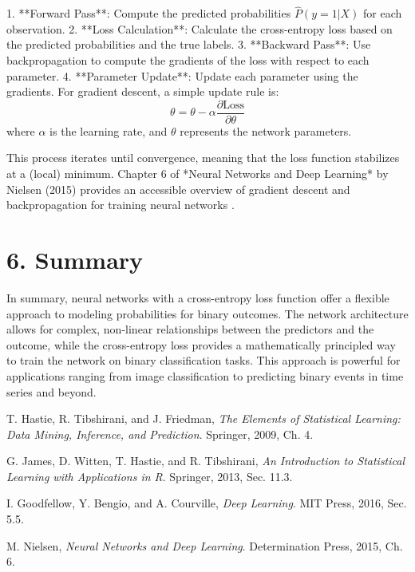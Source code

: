 \documentclass{article}
\begin{document}
1. **Forward Pass**: Compute the predicted probabilities \( \hat{P}(y=1 | X) \) for each observation.
2. **Loss Calculation**: Calculate the cross-entropy loss based on the predicted probabilities and the true labels.
3. **Backward Pass**: Use backpropagation to compute the gradients of the loss with respect to each parameter.
4. **Parameter Update**: Update each parameter using the gradients. For gradient descent, a simple update rule is:
   \[
   \theta = \theta - \alpha \frac{\partial \text{Loss}}{\partial \theta}
   \]
   where \( \alpha \) is the learning rate, and \( \theta \) represents the network parameters.

This process iterates until convergence, meaning that the loss function stabilizes at a (local) minimum. Chapter 6 of *Neural Networks and Deep Learning* by Nielsen (2015) provides an accessible overview of gradient descent and backpropagation for training neural networks \cite{nielsen2015neural}.

\section*{6. Summary}

In summary, neural networks with a cross-entropy loss function offer a flexible approach to modeling probabilities for binary outcomes. The network architecture allows for complex, non-linear relationships between the predictors and the outcome, while the cross-entropy loss provides a mathematically principled way to train the network on binary classification tasks. This approach is powerful for applications ranging from image classification to predicting binary events in time series and beyond.

\begin{thebibliography}{9}

T. Hastie, R. Tibshirani, and J. Friedman,
\textit{The Elements of Statistical Learning: Data Mining, Inference, and Prediction}.
Springer, 2009, Ch. 4.

G. James, D. Witten, T. Hastie, and R. Tibshirani,
\textit{An Introduction to Statistical Learning with Applications in R}.
Springer, 2013, Sec. 11.3.

I. Goodfellow, Y. Bengio, and A. Courville,
\textit{Deep Learning}.
MIT Press, 2016, Sec. 5.5.

M. Nielsen,
\textit{Neural Networks and Deep Learning}.
Determination Press, 2015, Ch. 6.

\end{thebibliography}
\end{document}
